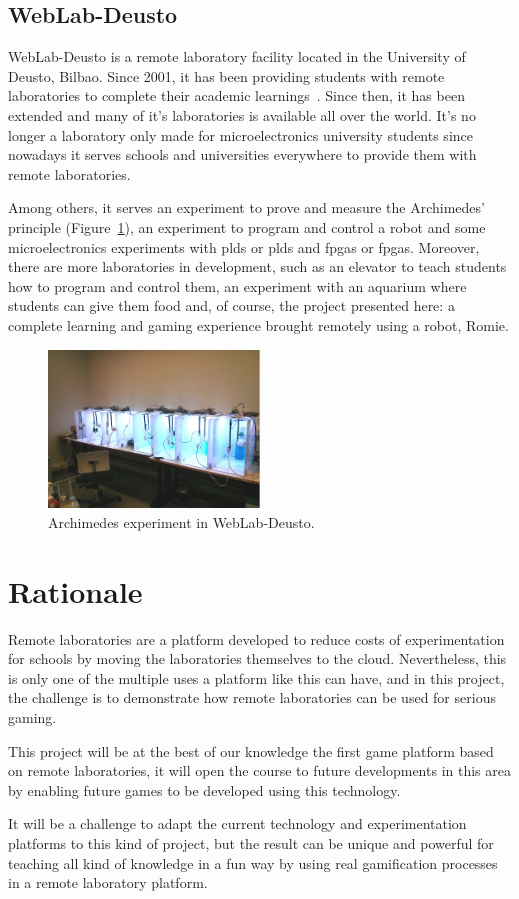 \subsection{WebLab-Deusto}

WebLab-Deusto is a remote laboratory facility located in the University of Deusto, Bilbao. Since
2001, it has been providing students with remote laboratories to complete their academic
learnings~\cite{weblab}. Since then, it has been extended and many of it's laboratories is available
all over the world. It's no longer a laboratory only made for microelectronics university students
since nowadays it serves schools and universities everywhere to provide them with remote
laboratories.

Among others, it serves an experiment to prove and measure the Archimedes' principle
(Figure~\ref{fig:archimedes}), an experiment to program and control a robot and some
microelectronics experiments with \acrlong{pld}s or \acrshort{pld}s and \acrlong{fpga}s or
\acrshort{fpga}s. Moreover, there are more laboratories in development, such as an elevator to teach
students how to program and control them, an experiment with an aquarium where students can give
them food and, of course, the project presented here: a complete learning and gaming experience
brought remotely using a robot, Romie.

\begin{figure}[!htbp]
	\centering
	\includegraphics[width=0.5\textwidth]{fig/archimedes.jpg}
	\caption{Archimedes experiment in WebLab-Deusto.}\label{fig:archimedes}
\end{figure}

\section{Rationale}

Remote laboratories are a platform developed to reduce costs of experimentation for schools by
moving the laboratories themselves to the cloud. Nevertheless, this is only one of the multiple uses
a platform like this can have, and in this project, the challenge is to demonstrate how remote
laboratories can be used for serious gaming.

This project will be at the best of our knowledge the first game platform based on remote
laboratories, it will open the course to future developments in this area by enabling future games
to be developed using this technology.

It will be a challenge to adapt the current technology and experimentation platforms to this kind of
project, but the result can be unique and powerful for teaching all kind of knowledge in a fun way
by using real gamification processes in a remote laboratory platform.
